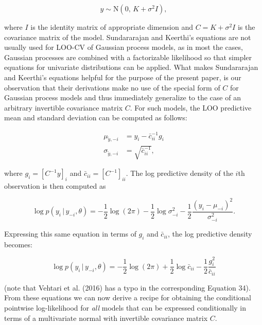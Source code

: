 \documentclass[english,,doc,floatsintext]{apa6}
\theoremstyle{definition}
\theoremstyle{definition}
\theoremstyle{definition}
\theoremstyle{remark}
\begin{document}
\begin{equation}
y \sim {\mathrm N}(0, \, K+\sigma^2 I),
\end{equation}

where \(I\) is the identity matrix of appropriate dimension and
\(C = K+\sigma^2 I\) is the covariance matrix of the model. Sundararajan
and Keerthi's equations are not usually used for LOO-CV of Gaussian
process models, as in most the cases, Gaussian processes are combined
with a factorizable likelihood so that simpler equations for univariate
distributions can be applied. What makes Sundararajan and Keerthi's
equations helpful for the purpose of the present paper, is our
observation that their derivations make no use of the special form of
\(C\) for Gaussian process models and thus immediately generalize to the
case of an arbitrary invertible covariance matrix \(C\). For such
models, the LOO predictive mean and standard deviation can be computed
as follows:

\begin{align}
\label{ypredpars}
  \mu_{\tilde{y},-i} &= y_i-\bar{c}_{ii}^{-1} g_i \nonumber \\
  \sigma_{\tilde{y},-i} &= \sqrt{\bar{c}_{ii}^{-1}},
\end{align}

where \(g_i = \left[C^{-1} y\right]_i\) and
\(\bar{c}_{ii} = \left[C^{-1}\right]_{ii}\). The log predictive density
of the \(i\)th observation is then computed as

\begin{equation}
  \log p(y_i \,|\, y_{-i},\theta)
  = - \frac{1}{2}\log(2\pi)
  - \frac{1}{2}\log \sigma^2_{-i}
  - \frac{1}{2}\frac{(y_i-\mu_{-i})^2}{\sigma^2_{-i}}.
\end{equation}

Expressing this same equation in terms of \(g_i\) and \(\bar{c}_{ii}\),
the log predictive density becomes:

\begin{equation}
  \log p(y_i \,|\, y_{-i},\theta)
  = - \frac{1}{2}\log(2\pi)
  + \frac{1}{2}\log \bar{c}_{ii}
  - \frac{1}{2}\frac{g_i^2}{\bar{c}_{ii}}
\end{equation}

(note that Vehtari et al. (2016) has a typo in the corresponding
Equation 34). From these equations we can now derive a recipe for
obtaining the conditional pointwise log-likelihood for \emph{all} models
that can be expressed conditionally in terms of a multivariate normal
with invertible covariance matrix \(C\).
\end{document}
